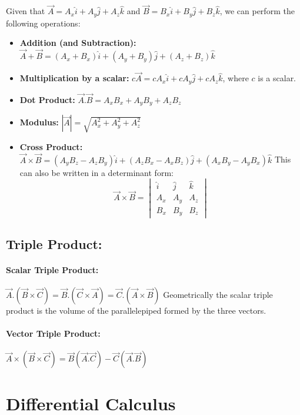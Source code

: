 \documentclass{article}
\begin{document}
    Given that $\vec{A} = A_x \hat{i} + A_y \hat{j} + A_z \hat{k}$ and $\vec{B} = B_x \hat{i} + B_y \hat{j} + B_z \hat{k}$, we can perform the following operations:
    \begin{itemize}
        \item \textbf{Addition (and Subtraction):} $\vec{A} + \vec{B} = (A_x + B_x) \hat{i} + (A_y + B_y) \hat{j} + (A_z + B_z) \hat{k}$
        \item \textbf{Multiplication by a scalar: } $c\vec{A} = cA_x \hat{i} + cA_y \hat{j} + cA_z \hat{k}$, where $c$ is a scalar.
        \item \textbf{Dot Product: } $\vec{A}.\vec{B} = A_xB_x + A_yB_y + A_zB_z$
        \item \textbf{Modulus: } $|\vec{A}| = \sqrt{A_x^2 + A_y^2 + A_z^2}$
        \item \textbf{Cross Product: } $\vec{A} \times \vec{B} = (A_yB_z - A_zB_y) \hat{i} + (A_zB_x - A_xB_z) \hat{j} + (A_xB_y - A_yB_x) \hat{k}$
            This can also be written in a determinant form:
            \[\vec{A} \times \vec{B} = \begin{vmatrix}
                \hat{i} & \hat{j} & \hat{k} \\
                A_x & A_y & A_z \\
                B_x & B_y & B_z
            \end{vmatrix}\]
    \end{itemize}
    \subsection{Triple Product: }
    \paragraph*{Scalar Triple Product: } $\vec{A}.(\vec{B} \times \vec{C}) = \vec{B}.(\vec{C} \times \vec{A}) = \vec{C}.(\vec{A} \times \vec{B})$
    Geometrically the scalar triple product is the volume of the parallelepiped formed by the three vectors.
    \paragraph*{Vector Triple Product: } $\vec{A} \times (\vec{B} \times \vec{C}) = \vec{B}(\vec{A}.\vec{C}) - \vec{C}(\vec{A}.\vec{B})$

\section{Differential Calculus}
\end{document}
